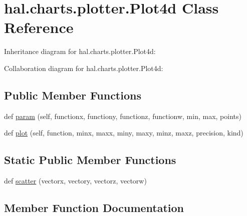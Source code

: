 \hypertarget{classhal_1_1charts_1_1plotter_1_1_plot4d}{}\section{hal.\+charts.\+plotter.\+Plot4d Class Reference}
\label{classhal_1_1charts_1_1plotter_1_1_plot4d}


Inheritance diagram for hal.\+charts.\+plotter.\+Plot4d\+:


Collaboration diagram for hal.\+charts.\+plotter.\+Plot4d\+:
\subsection*{Public Member Functions}
\begin{DoxyCompactItemize}
\item 
def \hyperlink{classhal_1_1charts_1_1plotter_1_1_plot4d_a925008c5f9e89231a632fdad42a6cdff}{param} (self, functionx, functiony, functionz, functionw, min, max, points)
\item 
def \hyperlink{classhal_1_1charts_1_1plotter_1_1_plot4d_a0826f5d596a40fb6ec31f6f2636b55e9}{plot} (self, function, minx, maxx, miny, maxy, minz, maxz, precision, kind)
\end{DoxyCompactItemize}
\subsection*{Static Public Member Functions}
\begin{DoxyCompactItemize}
\item 
def \hyperlink{classhal_1_1charts_1_1plotter_1_1_plot4d_aa5b31430953600e79cdb0dd609d0e971}{scatter} (vectorx, vectory, vectorz, vectorw)
\end{DoxyCompactItemize}


\subsection{Member Function Documentation}
